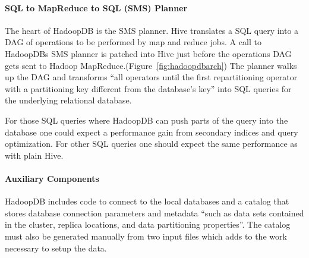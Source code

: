 \documentclass[12pt,a4paper]{scrartcl}		%
\begin{document}
\paragraph{SQL to MapReduce to SQL (SMS) Planner}
The heart of HadoopDB is the SMS planner. Hive translates a SQL query into a DAG of operations to be performed by map and reduce jobs. A call to HadoopDBs SMS planner is patched into Hive just before the operations DAG gets sent to Hadoop MapReduce.(Figure~\ref{fig:hadoopdbarch}) The planner walks up the DAG and transforms ``all operators until the first repartitioning operator with a partitioning key different from the database's key'' into SQL queries for the underlying relational database. 

For those SQL queries where HadoopDB can push parts of the query into the database one could expect a performance gain from secondary indices and query optimization. For other SQL queries one should expect the same performance as with plain Hive.

\paragraph{Auxiliary Components}
HadoopDB includes code to connect to the local databases and a catalog that stores database connection parameters and metadata ``such as data sets contained in the cluster, replica locations, and data partitioning properties''. The catalog must also be generated manually from two input files which adds to the work necessary to setup the data.
\end{document}
